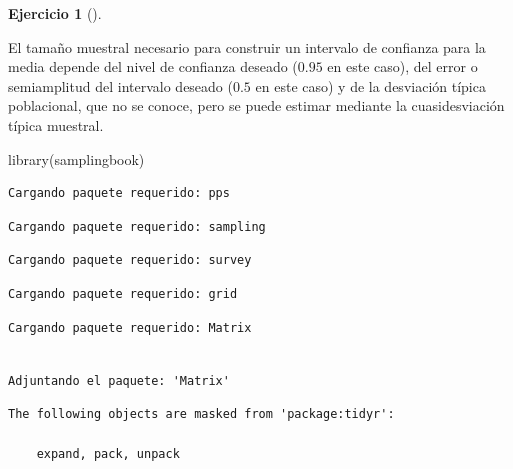 \documentclass[
  a4paper,
]{scrreport}
\newenvironment{Shaded}{\begin{snugshade}}{\end{snugshade}}
\newcommand{\FunctionTok}[1]{\textcolor[rgb]{0.28,0.35,0.67}{#1}}
\newcommand{\NormalTok}[1]{\textcolor[rgb]{0.00,0.23,0.31}{#1}}
\theoremstyle{definition}
\newtheorem{exercise}{Ejercicio}[chapter]
\theoremstyle{remark}
\begin{document}
\begin{exercise}[]
\begin{enumerate}
  \begin{tcolorbox}[enhanced jigsaw, breakable, toptitle=1mm, colbacktitle=quarto-callout-tip-color!10!white, rightrule=.15mm, opacityback=0, opacitybacktitle=0.6, titlerule=0mm, coltitle=black, colframe=quarto-callout-tip-color-frame, colback=white, bottomtitle=1mm, leftrule=.75mm, toprule=.15mm, title=\textcolor{quarto-callout-tip-color}{\faLightbulb}\hspace{0.5em}{Solución}, arc=.35mm, bottomrule=.15mm, left=2mm]

  El tamaño muestral necesario para construir un intervalo de confianza
  para la media depende del nivel de confianza deseado (\(0.95\) en este
  caso), del error o semiamplitud del intervalo deseado (\(0.5\) en este
  caso) y de la desviación típica poblacional, que no se conoce, pero se
  puede estimar mediante la cuasidesviación típica muestral.

\begin{Shaded}
\begin{Highlighting}[]
\FunctionTok{library}\NormalTok{(samplingbook)}
\end{Highlighting}
\end{Shaded}

\begin{verbatim}
Cargando paquete requerido: pps
\end{verbatim}

\begin{verbatim}
Cargando paquete requerido: sampling
\end{verbatim}

\begin{verbatim}
Cargando paquete requerido: survey
\end{verbatim}

\begin{verbatim}
Cargando paquete requerido: grid
\end{verbatim}

\begin{verbatim}
Cargando paquete requerido: Matrix
\end{verbatim}

\begin{verbatim}

Adjuntando el paquete: 'Matrix'
\end{verbatim}

\begin{verbatim}
The following objects are masked from 'package:tidyr':

    expand, pack, unpack
\end{verbatim}


\end{tcolorbox}
\end{enumerate}
\end{exercise}
\end{document}

